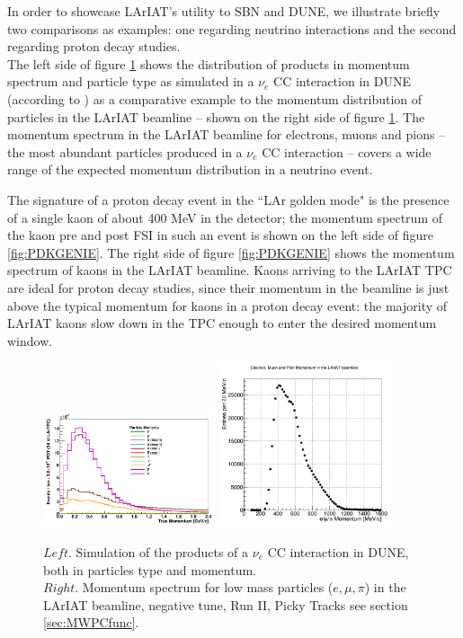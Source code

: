 In order to showcase LArIAT's utility to SBN and DUNE, we illustrate briefly two comparisons as examples: one regarding neutrino interactions and the second regarding proton decay studies.\\
The left side of figure \ref{fig:NuSimulation} shows the distribution of products in momentum spectrum and particle type as simulated in a $\nu_e$ CC interaction in DUNE (according to \cite{LeiguideOliveira:1953730}) as  a comparative example to the momentum distribution of particles in the LArIAT beamline -- shown on the right side of figure \ref{fig:NuSimulation}. The momentum spectrum in the LArIAT beamline for electrons, muons and pions -- the most abundant particles produced in  a $\nu_e$ CC interaction -- covers a wide range of the expected momentum distribution in a neutrino event.


The signature of a proton decay event in the ``LAr golden mode" is the presence of a single kaon of about 400 MeV in the detector; the momentum spectrum of the kaon pre and post FSI in such an event is shown on the left side of figure \ref{fig:PDKGENIE}. The right side of figure \ref{fig:PDKGENIE} shows the momentum spectrum of kaons in the LArIAT beamline. Kaons arriving to the LArIAT TPC are ideal for proton decay studies, since their momentum in the beamline is just above the typical momentum for kaons in a proton decay event: the majority of LArIAT kaons slow down in the TPC enough to enter the desired momentum window.


\begin{figure}[hbpt]
\centering
\includegraphics[width=0.45\textwidth]{Chapter-2/Images/NueCCSim.png}	
\includegraphics[width=0.45\textwidth]{Chapter-2/Images/momentumPiMuE.png}
\caption{$Left$. Simulation of the products of a $\nu_e$ CC interaction in DUNE, both in particles type and momentum. \\
$Right$. Momentum spectrum for low mass particles ($e,\mu,\pi$) in the LArIAT beamline,  negative tune, Run II, Picky Tracks see section \ref{sec:MWPCfunc}. }
\label{fig:NuSimulation}
\end{figure}


